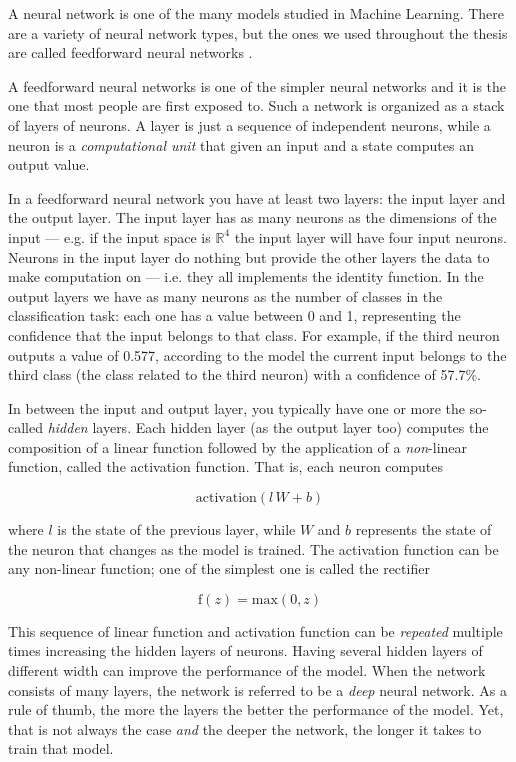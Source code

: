 A neural network is one of the many models studied in Machine Learning.
There are a variety of neural network types, but the ones we used
throughout the thesis are called feedforward neural
networks \cite{Goodfellow-et-al-2016}.

A feedforward neural networks is one of the simpler neural networks and
it is the one that most people are first exposed to. Such a network is
organized as a stack of layers of neurons. A layer is just a sequence
of independent neurons, while a neuron is a \emph{computational unit}
that given an input and a state computes an output value.

In a feedforward neural network you have at least two layers: the input
layer and the output layer. The input layer has as many neurons as the
dimensions of the input --- e.g. if the input space is $\mathbb{R}^4$
the input layer will have four input neurons. Neurons in the input
layer do nothing but provide the other layers the data to make
computation on --- i.e. they all implements the identity function.
In the output layers we have as many neurons as the number of
classes in the classification task: each one has a value between 0 and
1, representing the confidence that the input belongs to that class.
For example, if the third neuron outputs a value of 0.577, according to
the model the current input belongs to the third class (the class
related to the third neuron) with a confidence of 57.7\%.

In between the input and output layer, you typically have one or more
the so-called \emph{hidden} layers. Each hidden layer (as the output
layer too) computes the composition of a linear function followed by
the application of a \emph{non}-linear function, called the activation
function. That is, each neuron computes

\[ \text{activation}(l \, W + b) \]

where $l$ is the state of the previous layer, while $W$ and $b$
represents the state of the neuron that changes as the model is
trained. The activation function can be any non-linear function; one of
the simplest one is called the rectifier

\[ \text{f}(z) = \text{max}(0, z) \]

This sequence of linear function and activation function can be
\emph{repeated} multiple times increasing the hidden layers of neurons.
Having several hidden layers of different width can improve the
performance of the model. When the network consists of many layers, the
network is referred to be a \emph{deep} neural network. As a rule of
thumb, the more the layers the better the performance of the model.
Yet, that is not always the case \emph{and} the deeper the network, the
longer it takes to train that model.


